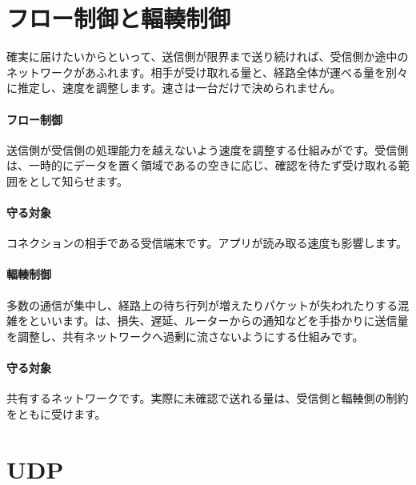 \par
\endgroup
\par
\endgroup


\section{フロー制御と輻輳制御}
\label{sec:05-network-12}

確実に届けたいからといって、送信側が限界まで送り続ければ、受信側か途中のネットワークがあふれます。相手が受け取れる量と、経路全体が運べる量を別々に推定し、速度を調整します。速さは一台だけで決められません。

\begingroup
\begingroup
\paragraph{フロー制御}
        送信側が受信側の処理能力を越えないよう速度を調整する仕組みがです。受信側は、一時的にデータを置く領域であるの空きに応じ、確認を待たず受け取れる範囲をとして知らせます。

\paragraph{守る対象}
        コネクションの相手である受信端末です。アプリが読み取る速度も影響します。

\par
\endgroup
\medskip
\begingroup
\paragraph{輻輳制御}
        多数の通信が集中し、経路上の待ち行列が増えたりパケットが失われたりする混雑をといいます。は、損失、遅延、ルーターからの通知などを手掛かりに送信量を調整し、共有ネットワークへ過剰に流さないようにする仕組みです。

\paragraph{守る対象}
        共有するネットワークです。実際に未確認で送れる量は、受信側と輻輳側の制約をともに受けます。

\par
\endgroup
\par
\endgroup


\section{UDP}
\label{sec:05-network-13}

